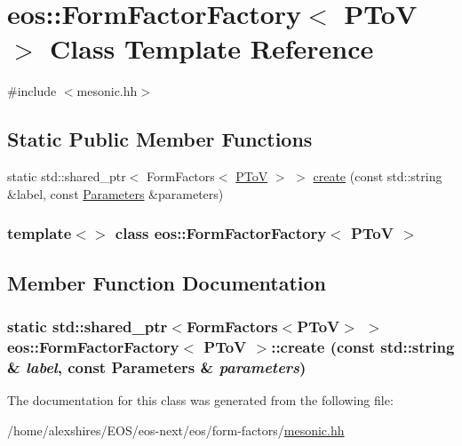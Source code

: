 \hypertarget{classeos_1_1FormFactorFactory_3_01PToV_01_4}{
\section{eos::FormFactorFactory$<$ PToV $>$ Class Template Reference}
\label{classeos_1_1FormFactorFactory_3_01PToV_01_4}
}


{\ttfamily \#include $<$mesonic.hh$>$}\subsection*{Static Public Member Functions}
\begin{DoxyCompactItemize}
\item 
static std::shared\_\-ptr$<$ FormFactors$<$ \hyperlink{structeos_1_1PToV}{PToV} $>$ $>$ \hyperlink{classeos_1_1FormFactorFactory_3_01PToV_01_4_a74cbe8da36dd05047987533d3468a4a7}{create} (const std::string \&label, const \hyperlink{classeos_1_1Parameters}{Parameters} \&parameters)
\end{DoxyCompactItemize}
\subsubsection*{template$<$$>$ class eos::FormFactorFactory$<$ PToV $>$}



\subsection{Member Function Documentation}
\hypertarget{classeos_1_1FormFactorFactory_3_01PToV_01_4_a74cbe8da36dd05047987533d3468a4a7}{
\subsubsection[{create}]{\setlength{\rightskip}{0pt plus 5cm}static std::shared\_\-ptr$<$FormFactors$<${\bf PToV}$>$ $>$ eos::FormFactorFactory$<$ {\bf PToV} $>$::create (const std::string \& {\em label}, \/  const {\bf Parameters} \& {\em parameters})}}
\label{classeos_1_1FormFactorFactory_3_01PToV_01_4_a74cbe8da36dd05047987533d3468a4a7}


The documentation for this class was generated from the following file:\begin{DoxyCompactItemize}
\item 
/home/alexshires/EOS/eos-\/next/eos/form-\/factors/\hyperlink{mesonic_8hh}{mesonic.hh}\end{DoxyCompactItemize}

